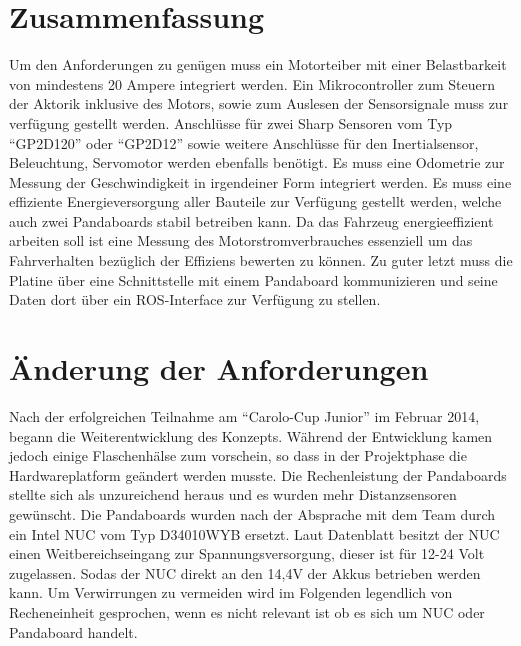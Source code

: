 \section{Zusammenfassung}
Um den Anforderungen zu genügen muss ein Motorteiber mit einer Belastbarkeit von mindestens 20 Ampere integriert werden. 
Ein Mikrocontroller zum Steuern der Aktorik inklusive des Motors, sowie zum Auslesen der Sensorsignale muss zur verfügung gestellt werden. 
Anschlüsse für zwei Sharp Sensoren vom Typ ``GP2D120'' oder ``GP2D12'' sowie weitere Anschlüsse für den Inertialsensor, Beleuchtung, Servomotor werden ebenfalls benötigt. 
Es muss eine Odometrie zur Messung der Geschwindigkeit in irgendeiner Form integriert werden.
Es muss eine effiziente Energieversorgung aller Bauteile zur Verfügung gestellt werden, welche auch zwei Pandaboards stabil betreiben kann. 
Da das Fahrzeug energieeffizient arbeiten soll ist eine Messung des Motorstromverbrauches essenziell um das Fahrverhalten bezüglich der Effiziens bewerten zu können.
Zu guter letzt muss die Platine über eine Schnittstelle mit einem Pandaboard kommunizieren und seine Daten dort über ein ROS-Interface zur Verfügung zu stellen.

\section{Änderung der Anforderungen}
Nach der erfolgreichen Teilnahme am ``Carolo-Cup Junior'' im Februar 2014, begann die Weiterentwicklung des Konzepts. Während der Entwicklung kamen jedoch
einige Flaschenhälse zum vorschein, so dass in der Projektphase die Hardwareplatform geändert werden musste. Die Rechenleistung der Pandaboards stellte sich
als unzureichend heraus und es wurden mehr Distanzsensoren gewünscht. Die Pandaboards wurden nach der Absprache mit dem Team durch ein Intel NUC vom Typ
D34010WYB ersetzt. Laut Datenblatt \cite{datasheet-nuc} besitzt der NUC einen Weitbereichseingang zur Spannungsversorgung, dieser ist für 12-24 Volt zugelassen.
Sodas der NUC direkt an den 14,4V der Akkus betrieben werden kann.  Um Verwirrungen zu vermeiden wird im Folgenden legendlich von Recheneinheit gesprochen, wenn
es nicht relevant ist ob es sich um NUC oder Pandaboard handelt.
